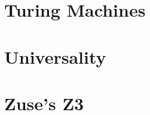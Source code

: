\documentclass {article}
\begin{document}


\section{Turing Machines}



\section{Universality}



\section{Zuse's Z3}







\end{document}

